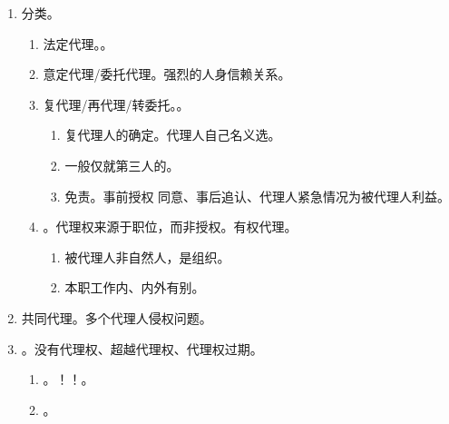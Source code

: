 \begin{enumerate}
\begin{enumerate}
                \begin{enumerate}
                  \item 自己代理。一身二职 \yjt 相对无效。。
                  \item 双方代理。一仆二主 \yjt 相对无效。。
                  \item {}。考的最多。。
                \end{enumerate}
        \end{enumerate}
  \item 分类。
        \begin{enumerate}
          \item 法定代理。。
          \item 意定代理/委托代理。强烈的人身信赖关系。
          \item 复代理/再代理/转委托。。
                \begin{enumerate}
                  \item 复代理人的确定。代理人自己名义选。
                  \item 一般仅就第三人的。
                  \item 免责。事前授权 \hz 同意、事后追认、代理人紧急情况为被代理人利益。
                \end{enumerate}
          \item {}。代理权来源于职位，而非授权。有权代理。
                \begin{enumerate}
                  \item 被代理人非自然人，是组织。
                  \item 本职工作内、内外有别。
                \end{enumerate}
        \end{enumerate}
  \item 共同代理。多个代理人侵权问题。
  \item {}。没有代理权、超越代理权、代理权过期。
        \begin{enumerate}
          \item {}。！！。
          \item {}。

\end{enumerate}
\end{enumerate}

